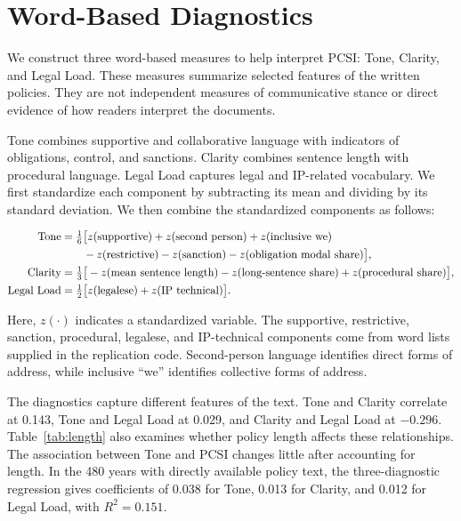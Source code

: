 \documentclass[11pt]{article}
\begin{document}


\section{Word-Based Diagnostics}\label{app:linguistic}
\setcounter{table}{0}

We construct three word-based measures to help interpret PCSI: Tone, Clarity, and Legal Load. These measures summarize selected features of the written policies. They are not independent measures of communicative stance or direct evidence of how readers interpret the documents.

Tone combines supportive and collaborative language with indicators of obligations, control, and sanctions. Clarity combines sentence length with procedural language. Legal Load captures legal and IP-related vocabulary. We first standardize each component by subtracting its mean and dividing by its standard deviation. We then combine the standardized components as follows:

\begin{align}
\text{Tone}
&= \tfrac{1}{6}\big[
 z(\text{supportive}) + z(\text{second person}) + z(\text{inclusive we}) \notag\\
&\qquad - z(\text{restrictive}) - z(\text{sanction}) - z(\text{obligation modal share})\big],\\
\text{Clarity}
&= \tfrac{1}{3}\big[-z(\text{mean sentence length}) - z(\text{long-sentence share}) + z(\text{procedural share})\big],\\
\text{Legal Load}
&= \tfrac{1}{2}\big[z(\text{legalese}) + z(\text{IP technical})\big].
\end{align}

Here, $z(\cdot)$ indicates a standardized variable. The supportive, restrictive, sanction, procedural, legalese, and IP-technical components come from word lists supplied in the replication code. Second-person language identifies direct forms of address, while inclusive ``we'' identifies collective forms of address.

The diagnostics capture different features of the text. Tone and Clarity correlate at 0.143, Tone and Legal Load at 0.029, and Clarity and Legal Load at $-0.296$. Table~\ref{tab:length} also examines whether policy length affects these relationships. The association between Tone and PCSI changes little after accounting for length. In the 480 years with directly available policy text, the three-diagnostic regression gives coefficients of 0.038 for Tone, 0.013 for Clarity, and 0.012 for Legal Load, with $R^2=0.151$.
\end{document}
